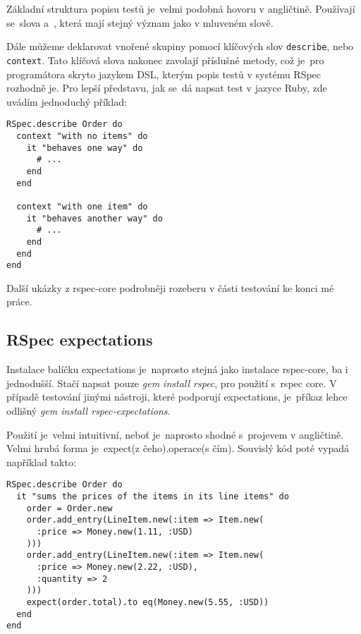 \par Základní struktura popisu testů je~velmi podobná hovoru v angličtině. Používají se~slova  a~, která mají stejný význam jako v mluveném slově.

\par Dále můžeme deklarovat vnořené skupiny pomocí klíčových slov \texttt{describe}, nebo \texttt{context}. Tato klíčová slova nakonec zavolají příslušné metody, což je~pro programátora skryto jazykem DSL, kterým popis testů v systému RSpec rozhodně je. Pro lepší představu, jak se~dá napsat test v jazyce Ruby, zde uvádím jednoduchý příklad:
\begin{verbatim}
RSpec.describe Order do
  context "with no items" do
    it "behaves one way" do
      # ...
    end
  end

  context "with one item" do
    it "behaves another way" do
      # ...
    end
  end
end
\end{verbatim}
Další ukázky z rspec-core podrobněji rozeberu v části testování ke konci mé práce.

\subsection{RSpec expectations}
\par Instalace balíčku expectations je~naprosto stejná jako instalace rspec-core, ba i jednodušší. Stačí napsat pouze \textit{gem install rspec}, pro použití s~rspec core. V případě testování jinými nástroji, které podporují expectations, je~příkaz lehce odlišný \textit{gem install rspec-expectations}.


\par Použití je~velmi intuitivní, neboť je~naprosto shodné s~projevem v angličtině. Velmi hrubá forma je~expect(z čeho).operace(s čím). Souvislý kód poté vypadá například takto:
\begin{verbatim}
RSpec.describe Order do
  it "sums the prices of the items in its line items" do
    order = Order.new
    order.add_entry(LineItem.new(:item => Item.new(
      :price => Money.new(1.11, :USD)
    )))
    order.add_entry(LineItem.new(:item => Item.new(
      :price => Money.new(2.22, :USD),
      :quantity => 2
    )))
    expect(order.total).to eq(Money.new(5.55, :USD))
  end
end
\end{verbatim}

